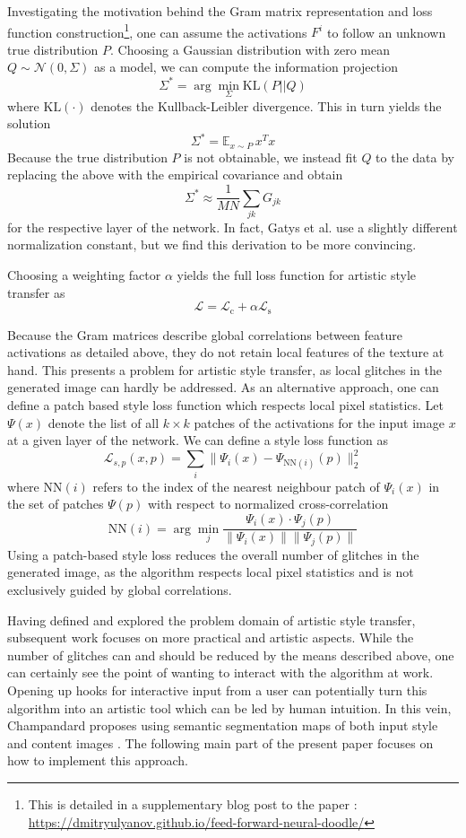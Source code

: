 Investigating the motivation behind the Gram matrix representation and loss function construction\footnote{This is detailed in a supplementary blog post to the paper \cite{ulyanov2016texture}: \url{https://dmitryulyanov.github.io/feed-forward-neural-doodle/}}, one can assume the activations \(F^i\) to follow an unknown true distribution \(P\). Choosing a Gaussian distribution with zero mean \(Q\sim \mathcal{N}(0,\Sigma)\) as a model, we can compute the information projection
\[\Sigma^\ast = \arg\min_\Sigma \text{KL}(P||Q)\]
where \(\text{KL}(\cdot)\) denotes the Kullback-Leibler divergence. This in turn yields the solution
\[\Sigma^\ast = \mathbb{E}_{x\sim P} \,x^Tx\]
Because the true distribution \(P\) is not obtainable, we instead fit \(Q\) to the data by replacing the above with the empirical covariance and obtain
\[\Sigma^\ast \approx \frac{1}{MN} \sum_{jk} G_{jk}\]
for the respective layer of the network. In fact, Gatys et al. use a slightly different normalization constant, but we find this derivation to be more convincing.

Choosing a weighting factor \(\alpha\) yields the full loss function for artistic style transfer as 
\[\mathcal{L} = \mathcal{L}_\text{c}+\alpha \mathcal{L}_\text{s}\]

Because the Gram matrices describe global correlations between feature activations as detailed above, they do not retain local features of the texture at hand. This presents a problem for artistic style transfer, as local glitches in the generated image can hardly be addressed. As an alternative approach, one can define a patch based style loss function \cite{mrf2016} which respects local pixel statistics. Let \(\Psi(x)\) denote the list of all \(k\times k\) patches of the activations for the input image \(x\) at a given layer of the network. We can define a style loss function as
\[\mathcal{L}_{s,p}(x,p) = \sum_i \|\Psi_i(x)-\Psi_{\text{NN}(i)}(p)\|_2^2\]
where \(\text{NN}(i)\) refers to the index of the nearest neighbour patch of \(\Psi_i(x)\) in the set of patches \(\Psi(p)\) with respect to normalized cross-correlation
\[\text{NN}(i) = \arg\min_{j} \frac{\Psi_i(x)\cdot \Psi_j(p)}{\|\Psi_i(x)\|\|\Psi_j(p)\|}\]
Using a patch-based style loss reduces the overall number of glitches in the generated image, as the algorithm respects local pixel statistics and is not exclusively guided by global correlations.

Having defined and explored the problem domain of artistic style transfer, subsequent work focuses on more practical and artistic aspects. While the number of glitches can and should be reduced by the means described above, one can certainly see the point of wanting to interact with the algorithm at work. Opening up hooks for interactive input from a user can potentially turn this algorithm into an artistic tool which can be led by human intuition. In this vein, Champandard proposes using semantic segmentation maps of both input style and content images \cite{doodles2016}. The following main part of the present paper focuses on how to implement this approach.


